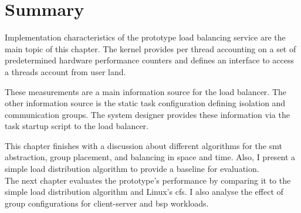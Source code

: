\section{Summary}
\label{impl:summary}

Implementation characteristics of the prototype load balancing service are the
main topic of this chapter.
The kernel provides per thread accounting on a set of predetermined hardware
performance counters and defines an interface to access a threads account from
user land.

These measurements are a main information source for the load balancer.
The other information source is the static task configuration defining
isolation and communication groups.
The system designer provides these information via the task startup script to
the load balancer.

This chapter finishes with a discussion about different algorithms for the
\gls{smt} abstraction, group placement, and balancing in space and time.
Also, I present a simple load distribution algorithm to provide a baseline for
evaluation.
\\

The next chapter evaluates the prototype's performance by comparing it to the
simple load distribution algorithm and Linux's \gls{cfs}.
I also analyse the effect of group configurations for client-server and
\gls{bsp} workloads.

